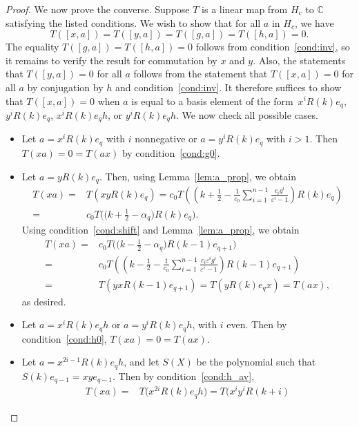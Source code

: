 \documentclass[10pt,a4paper]{amsart}
\newcommand\CC{\mathbb{C}}
\newcommand\eps{\varepsilon}
\newcommand\half{\ensuremath{\frac{1}{2}}}
\newcommand\thalf{\ensuremath{\tfrac12}}
\begin{document}
\begin{proof}
 We now prove the converse.
 Suppose $T$ is a linear map from $H_c$ to $\CC$
 satisfying the listed conditions.
 We wish to show that for all $a$ in $H_c$,
 we have
 \[
 T([x, a]) = T([y, a]) = T([g, a]) = T([h, a]) = 0.
 \]
 The equality $T([g, a]) = T([h, a]) = 0$ follows
 from condition~\ref{cond:inv},
 so it remains to verify the result for commutation by $x$ and $y$.
 Also, the statements that $T([y, a]) = 0$ for all $a$
 follows from the statement that $T([x, a]) = 0$ for all $a$
 by conjugation by $h$ and condition~\ref{cond:inv}.
 It therefore suffices to show that $T([x, a]) = 0$
 when $a$ is equal to a basis element
 of the form~$x^i R(k) e_q$, $y^i R(k) e_q$,
 $x^i R(k) e_q h$, or $y^i R(k) e_q h$.
 We now check all possible cases.
 \begin{itemize}\itemsep=0pt
 \item Let $a = x^i R(k) e_q$ with $i$ nonnegative
 or $a = y^i R(k) e_q$ with $i > 1$.
 Then $T(xa) = 0 = T(ax)$ by
 condition~\ref{cond:g0}.
 \item Let $a = y R(k) e_q$.
 Then, using Lemma~\ref{lem:a_prop}, we obtain
 \begin{align*}
 T(xa) ={}& T\left( xy R(k) e_q \right) = c_0 T\left( \left( k + \half -
 \frac1{c_0} \sum\limits_{i = 1}^{n - 1}
 \frac{c_i g^i}{\eps^i - 1} \right)
 R(k) e_q \right) \\
 ={}& c_0 T\bigl( \bigl( k + \thalf
 - \alpha_q \bigr) R(k) e_q \bigr).
 \end{align*}
 Using condition~\ref{cond:shift}
 and Lemma~\ref{lem:a_prop},
 we obtain
 \begin{align*}
 T(xa) ={}& c_0
 T\bigl( \bigl( k - \thalf - \alpha_q \bigr)
 R(k - 1) e_{q + 1} \bigr) \\
 ={}& c_0 T\left( \left( k - \half -
 \frac1{c_0} \sum\limits_{i = 1}^{n - 1}
 \frac{c_i \eps^i g^i}{\eps^i - 1} \right)
 R(k - 1) e_{q + 1} \right) \\
 ={}& T\left( yx R(k - 1) e_{q + 1} \right)= T\left( y R(k) e_q x \right)= T(ax),
 \end{align*}
 as desired.
 \item Let $a = x^i R(k) e_q h$
 or $a = y^i R(k) e_q h$,
 with $i$ even.
 Then by condition~\ref{cond:h0},
 $T(xa) = 0 = T(ax)$.
 \item Let $a = x^{2i - 1} R(k) e_q h$,
 and let $S(X)$ be the polynomial
 such that $S(k) e_{q - 1} = xy e_{q - 1}$.
 Then by condition~\ref{cond:h_av},
 \begin{align*}
 T(xa) ={}& T\bigl( x^{2i} R(k) e_q h \bigr)= T\bigl( x^i y^i R(k + i)

\end{align*}
\end{itemize}
\end{proof}
\end{document}
